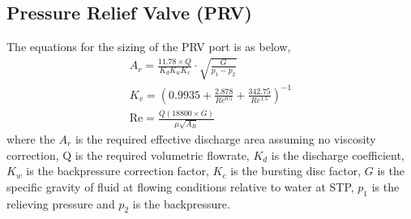 \begin{table}[h]
\centering
\caption{Cooling water sources for R101}
\label{tab:cwtable}
\end{table}

\subsection{Pressure Relief Valve (PRV)}
\label{app:PRV}
The equations for the sizing of the PRV port is as below,
\begin{align}
    A_r = \frac{11.78 \times Q}{K_d K_w K_c} \cdot \sqrt{\frac{G}{p_1-p_2}} \\
    K_v = (0.9935 + \frac{2.878}{Re^{0.5}} + \frac{342.75}{Re^{1.5}})^{-1} \\
    \mathrm{Re} = \frac{Q(18800 \times G)}{\mu \sqrt{A_R}}
\end{align}
where the $A_r$ is the required effective discharge area assuming no viscosity correction, Q is the required volumetric flowrate, $K_d$ is the discharge coefficient, $K_w$ is the backpressure correction factor, $K_c$ is the bursting disc factor, $G$ is the specific gravity of fluid at flowing conditions relative to water at STP, $p_1$ is the relieving pressure and $p_2$ is the backpressure. 
